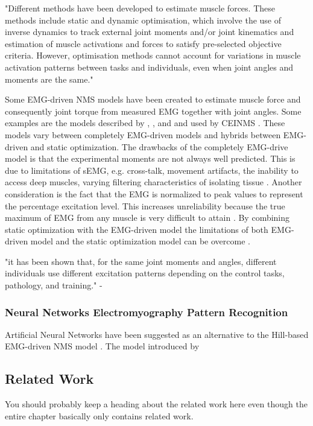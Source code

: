 "Different methods have been developed to estimate muscle forces. These methods include static and dynamic optimisation, which involve the use of inverse dynamics to track external joint moments and/or joint kinematics and estimation of muscle activations and forces to satisfy pre-selected objective criteria. However, optimisation methods cannot account for variations in muscle activation patterns  between tasks and individuals, even when joint angles and moments are the same." \cite{Pizzolato2015}

Some EMG-driven NMS models have been created to estimate muscle force and consequently joint torque from measured EMG together with joint angles. 
Some examples are the models described by  \citeauthor{Lloyd2003} \cite{Lloyd2003}, \citeauthor{Sartori2014} \cite{Sartori2014}, and \citeauthor{Sartori2012a} \cite{Sartori2012a} and used by CEINMS \cite{Pizzolato2015}. 
These models vary between completely EMG-driven models and hybrids between EMG-driven and static optimization.
The drawbacks of the completely EMG-drive model is that the experimental moments are not always well predicted.
This is due to limitations of sEMG, e.g. cross-talk, movement artifacts, the inability to access deep muscles, varying filtering characteristics of isolating tissue \cite{Lloyd2003, Sartori2014}.
Another consideration is the fact that the EMG is normalized to peak values to represent the percentage excitation level. 
This increases unreliability because the true maximum of EMG from any muscle is very difficult to attain \cite{Sartori2014}.
By combining static optimization with the EMG-driven model the limitations of both EMG-driven model and the static optimization model can be overcome \cite{Sartori2014}.

"it has been shown that, for the same joint moments and angles, different
individuals use different excitation patterns depending on the control
tasks, pathology, and training." - \cite[p. 3614]{Sartori2014}

\subsubsection{Neural Networks Electromyography Pattern Recognition}

Artificial Neural Networks have been suggested as an alternative to the Hill-based EMG-driven NMS model \cite{Sepulveda1993, Rosen1999}.
The model introduced by \citeauthor{Sepulveda1993} \cite{Sepulveda1993}

\subsection{Related Work}
You should probably keep a heading about the related work here even though the entire chapter basically only contains related work.
